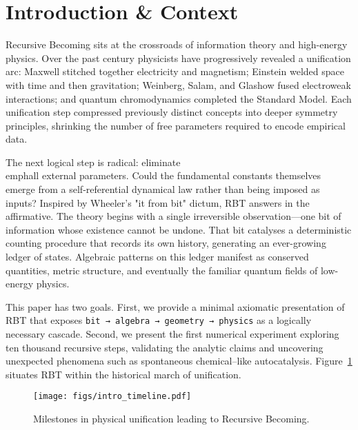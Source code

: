 \section{Introduction \& Context}
\label{sec:intro}

Recursive Becoming sits at the crossroads of information theory and high-energy physics.  Over the past century physicists have progressively revealed a unification arc: Maxwell stitched together electricity and magnetism; Einstein welded space with time and then gravitation; Weinberg, Salam, and Glashow fused electroweak interactions; and quantum chromodynamics completed the Standard Model.  Each unification step compressed previously distinct concepts into deeper symmetry principles, shrinking the number of free parameters required to encode empirical data.

The next logical step is radical: eliminate \\emph{all} external parameters.  Could the fundamental constants themselves emerge from a self-referential dynamical law rather than being imposed as inputs?  Inspired by Wheeler's "it from bit" dictum, RBT answers in the affirmative.  The theory begins with a single irreversible observation—one bit of information whose existence cannot be undone.  That bit catalyses a deterministic counting procedure that records its own history, generating an ever-growing ledger of states.  Algebraic patterns on this ledger manifest as conserved quantities, metric structure, and eventually the familiar quantum fields of low-energy physics.

This paper has two goals.  First, we provide a minimal axiomatic presentation of RBT that exposes \texttt{bit → algebra → geometry → physics} as a logically necessary cascade.  Second, we present the first numerical experiment exploring ten thousand recursive steps, validating the analytic claims and uncovering unexpected phenomena such as spontaneous chemical–like autocatalysis.  Figure~\ref{fig:intro-timeline} situates RBT within the historical march of unification.

\begin{figure}[h]
  \centering
  \texttt{[image: figs/intro\_timeline.pdf]}
  \caption{Milestones in physical unification leading to Recursive Becoming.}
  \label{fig:intro-timeline}
\end{figure}
\clearpage 